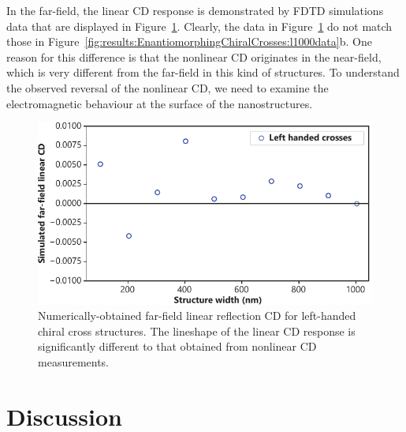 In the far-field, the linear CD response is demonstrated by FDTD simulations data that are displayed in Figure~\ref{fig:results:EnantiomorphingChiralCrosses:scatteringsim}. Clearly, the data in Figure~\ref{fig:results:EnantiomorphingChiralCrosses:scatteringsim} do not match those in Figure~\ref{fig:results:EnantiomorphingChiralCrosses:l1000data}b. One reason for this difference is that the nonlinear CD originates in the near-field, which is very different from the far-field in this kind of structures. To understand the observed reversal of the nonlinear CD, we need to examine the electromagnetic behaviour at the surface of the nanostructures. 

\begin{figure}[htb!]	
    \centering	
    \includegraphics[scale=1]{./figures/results/EnantiomorphingChiralCrosses/scattering_sim.pdf}
    \caption{\label{fig:results:EnantiomorphingChiralCrosses:scatteringsim}
    Numerically-obtained far-field linear reflection CD for left-handed chiral cross structures. The lineshape of the linear CD response is significantly different to that obtained from nonlinear CD measurements.}	
\end{figure}

\section{Discussion}\label{sec:results:EnantiomorphingChiralCrosses:discussion}

